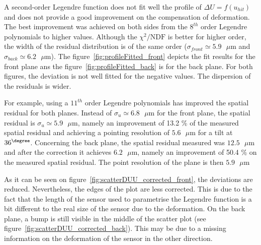       A second-order Legendre function does not fit well the profile of $\Delta U=f(u_{hit})$ and does not provide a good improvement on the compensation of deformation.
      The best improvement was achieved on both sides from the $8^{th}$ order Legendre polynomials to higher values.
      Although the $\chi^2 \text{/NDF}$ is better for higher order, the width of the residual distribution is of the same order ($\sigma_{front}\simeq 5.9 \text{ }\mu\text{m}$ and $\sigma_{back} \simeq 6.2 \text{ }\mu\text{m}$).
      The figure~\ref{fig:profileFitted_front} depicts the fit results for the front plane ans the figure~\ref{fig:profileFitted_back} is for the back plane.
      For both figures, the deviation is not well fitted for the negative values.
      The dispersion of the residuals is wider. 

      For example, using a $11^{th}$ order Legendre polynomials has improved the spatial residual for both planes. 
      Instead of $\sigma_{u} \simeq 6.8 \text{ }\mu\text{m}$ for the front plane, the spatial residual is $\sigma_{u} \simeq 5.9 \text{ }\mu\text{m}$, namely an improvement of 13.2 \% of the measured spatial residual and achieving a pointing resolution of $5.6 \text{ }\mu\text{m}$ for a tilt at $36^{\degree}$.
      Concerning the back plane, the spatial residual measured was $12.5 \text{ }\mu\text{m}$ and after the correction it achieves $6.2 \text{ }\mu\text{m}$, namely an improvement of 50.4 \% on the measured spatial residual.
      The point resolution of the plane is then $5.9 \text{ }\mu\text{m}$

      As it can be seen on figure~\ref{fig:scatterDUU_corrected_front}, the deviations are reduced. 
      Nevertheless, the edges of the plot are less corrected.
      This is due to the fact that the length of the sensor used to parametrise the Legendre function is a bit different to the real size of the sensor due to the deformation.
      On the back plane, a bump is still visible in the middle of the scatter plot (see figure~\ref{fig:scatterDUU_corrected_back}).
      This may be due to a missing information on the deformation of the sensor in the other direction.

